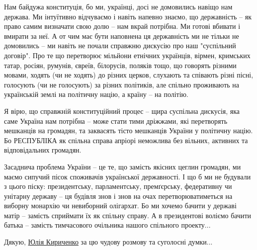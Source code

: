 \zzrule

Нам байдужа конституція, бо ми, українці, досі не домовились навіщо нам
держава. Ми інтуїтивно відчуваємо і навіть напевно знаємо, що державність – як
право самим визначати свою долю – нам вкрай потрібна. Ми готові вбивати і
вмирати за неї. А от чим має бути наповнена ця державність ми не тільки не
домовились – ми навіть не почали справжню дискусію про наш "суспільний
договір". Про те що перетворює мільйони етнічних українців, вірмен, кримських
татар, росіян, румунів, євреїв, білорусів, поляків тощо, що говорять різними
мовами, ходять (чи не ходять) до різних церков, слухають та співають різні
пісні, голосують (чи не голосують) за різних політиків, але спільно проживають
на українській землі на політичну націю, а країну – на політію. 

Я вірю, що справжній конституційний процес – щира суспільна дискусія, яка саме
Україна нам потрібна – може стати тими дріжжами, які перетворять мешканців на
громадян, та заквасять тісто мешканців України у політичну націю. Бо РЕСПУБЛІКА
як спільна справа апріорі неможлива без вільних, активних та відповідальних
громадян. 

Засаднича проблема України – це те, що замість якісних цеглин громадян, ми
маємо сипучий пісок споживачів української державності. І що б ми не будували з
цього піску: президентську, парламентську, премґєрську, федеративну чи унітарну
державу – ця будівля знов і знов на очах перетворюватиметься на виборну
монархію чи невиборний олігархат. Бо ми хочемо бачити у державі матір – замість
сприймати їх як спільну справу. А в президентові воліємо бачити батька –
замість тимчасового очільника нашого спільного проекту...

Дякую, \href{https://www.facebook.com/juliakyr}{Юлія Кириченко} за цю чудову розмову та суголосні думки...


